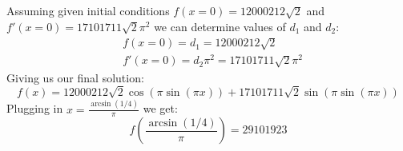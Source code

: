 \documentclass[12pt]{article}
\begin{document}
\subsection{}
Assuming given initial conditions $f(x=0) = 12000212\sqrt{2}$ and $f'(x=0) = 17101711\sqrt{2}\pi^2$ we can determine values of $d_1$ and $d_2$:
\begin{equation}
    \begin{split}
        &f(x=0) = d_1 = 12000212\sqrt{2}\\
        &f'(x=0) = d_2\pi^2 = 17101711\sqrt{2}\pi^2
    \end{split}
\end{equation}
Giving us our final solution:
\begin{equation}
    f(x) = 12000212\sqrt{2}\cos(\pi\sin(\pi x)) + 17101711\sqrt{2}\sin(\pi\sin(\pi x))
\end{equation}
Plugging in $x = \frac{\arcsin(1/4)}{\pi}$ we get:
\begin{equation}
    f\left(\frac{\arcsin(1/4)}{\pi}\right) = 29101923
\end{equation}
\end{document}
